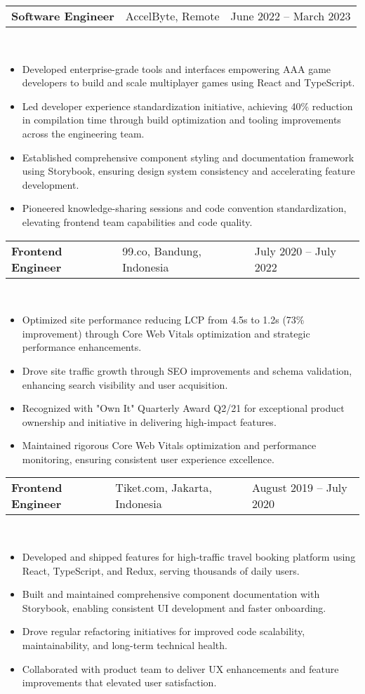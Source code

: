 \documentclass[a4paper, 11pt]{article}
\newcommand{\resumeItem}[1]{
  \item\small{
    {#1 \vspace{-2pt}}
  }
}
\newcommand{\resumeSubheading}[4]{
  \vspace{-2pt}\item
    \begin{tabularx}{0.987\textwidth}[t]{
  >{\raggedright\arraybackslash}X
  >{\centering\arraybackslash}X
  >{\raggedleft\arraybackslash}X }
      \textbf{#1} & #2 & #3 \\
    \end{tabularx}
    \textit{\small#4}\\
    \vspace{-7pt}
}
\newcommand{\resumeItemListStart}{\begin{itemize}[leftmargin=0.22in]}
\newcommand{\resumeItemListEnd}{\end{itemize}\vspace{-20pt}}
\begin{document}
        \resumeSubheading
            {Software Engineer}{AccelByte, Remote}{June 2022 -- March 2023}{}
            \resumeItemListStart
                \resumeItem{Developed enterprise-grade tools and interfaces empowering AAA game developers to build and scale multiplayer games using React and TypeScript.}
                \resumeItem{Led developer experience standardization initiative, achieving 40\% reduction in compilation time through build optimization and tooling improvements across the engineering team.}
                \resumeItem{Established comprehensive component styling and documentation framework using Storybook, ensuring design system consistency and accelerating feature development.}
                \resumeItem{Pioneered knowledge-sharing sessions and code convention standardization, elevating frontend team capabilities and code quality.}
            \resumeItemListEnd

        \resumeSubheading
            {Frontend Engineer}{99.co, Bandung, Indonesia}{July 2020 -- July 2022}{}
            \resumeItemListStart
                \resumeItem{Optimized site performance reducing LCP from 4.5s to 1.2s (73\% improvement) through Core Web Vitals optimization and strategic performance enhancements.}
                \resumeItem{Drove site traffic growth through SEO improvements and schema validation, enhancing search visibility and user acquisition.}
                \resumeItem{Recognized with "Own It" Quarterly Award Q2/21 for exceptional product ownership and initiative in delivering high-impact features.}
                \resumeItem{Maintained rigorous Core Web Vitals optimization and performance monitoring, ensuring consistent user experience excellence.}
            \resumeItemListEnd

        \resumeSubheading
            {Frontend Engineer}{Tiket.com, Jakarta, Indonesia}{August 2019 -- July 2020}{}
            \resumeItemListStart
                \resumeItem{Developed and shipped features for high-traffic travel booking platform using React, TypeScript, and Redux, serving thousands of daily users.}
                \resumeItem{Built and maintained comprehensive component documentation with Storybook, enabling consistent UI development and faster onboarding.}
                \resumeItem{Drove regular refactoring initiatives for improved code scalability, maintainability, and long-term technical health.}
                \resumeItem{Collaborated with product team to deliver UX enhancements and feature improvements that elevated user satisfaction.}
            \resumeItemListEnd
\end{document}
